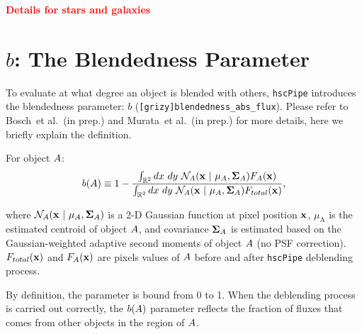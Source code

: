 \documentclass[useamsfonts]{pasj01}
\def\etal{{\ et al.~}}
\def\hscpipe{\texttt{hscPipe}}
\newcommand{\todo}[1]{\textcolor{red} {\textbf{#1}}}
\begin{document}
    \todo{Details for stars and galaxies}


\section{$b$: The Blendedness Parameter}
    \label{app:defineb}

    To evaluate at what degree an object is blended with others, \hscpipe{} introduces
    the blendedness parameter: $b$ (\texttt{[grizy]blendedness\_abs\_flux}).
    Please refer to Bosch\etal (in prep.) and Murata\etal (in prep.) for more details,
    here we briefly explain the definition.

    For object ${\rm A}$:
    \begin{eqnarray*}
        b({\rm A}) \equiv
        1-\frac{\int_{\mathbb{R}^2} {\rm d}x~ {\rm d}y\ \mathcal{N}_{\mathrm{A}}({\bf x}\ |\  \mu_{\mathrm{A}}, {\bf\Sigma}_{\mathrm{A}})
        F_{\mathrm{A}}({\bf x})}{\int_{\mathbb{R}^2} {\rm d}x~ {\rm d}y\ \mathcal{N}_{\mathrm{A}}({\bf x}\ |\  \mu_{\mathrm{A}},
        {\bf\Sigma}_{\rm{A}}) F_{\rm{total}}({\bf x})},
        \label{eq:defineb}
    \end{eqnarray*}

    \noindent
    where $\mathcal{N}_{\rm{A}}({ \bf x }\ |\  \mu_{\rm{A}}, {\bf\Sigma}_{\rm{A}})$
    is a 2-D Gaussian function at pixel position $\bf x$, $\mu_{\mathrm{A}}$ is the
    estimated centroid of object ${\rm A}$, and covariance ${\bf \Sigma}_{\mathrm{A}}$
    is estimated based on the Gaussian-weighted adaptive second moments of object
    ${\rm A}$ (no PSF correction).
    $F_{\mathrm{total}}({\bf x })$ and $F_{\rm{A}}({\bf x })$ are pixels values of
    ${\rm A}$ before and after \hscpipe{} deblending process.

    By definition, the parameter is bound from 0 to 1.
    When the deblending process is carried out correctly, the $b({\rm A})$ parameter
    reflects the fraction of fluxes that comes from other objects in the
    region of ${\rm A}$.

%

\label{lastpage}
\end{document}
